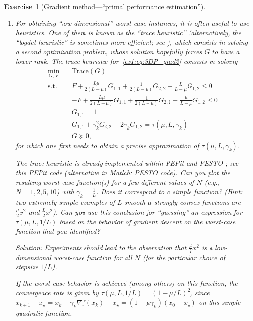 \documentclass[11pt,a4paper]{article}
\newcommand{\pesto}{{PESTO }}
\newcommand{\pepit}{{PEPit }}
\newcommand{\correction}[1]{{{\color{blue}\underline{Solution:} #1}}}
\newcommand{\correction}[1]{}
\newtheorem{exercise}{Exercise}
\begin{document}
\begin{exercise}[Gradient method---``primal performance estimation'']
\begin{enumerate}
	\item For obtaining ``low-dimensional'' worst-case instances, it is often useful to use heuristics. One of them is known as the ``trace heuristic'' (alternatively, the ``logdet heuristic'' is sometimes more efficient; see ), which consists in solving a second optimization problem, whose solution hopefully forces $G$ to have a lower rank. The trace heuristic for~\eqref{ex1:eq:SDP_grad2} consists in solving
	\begin{equation}\label{ex1:eq:trace}
	\begin{aligned}
				\min_{G,\, F} \quad & \mathrm{Trace}(G)\\
			\text{s.t. } \quad & F + \tfrac{L\mu}{2(L-\mu)} G_{1,1}+\tfrac{1}{2(L-\mu)}G_{2,2}-\tfrac{L}{L-\mu}G_{1,2}\leqslant 0\\
			&-F + \tfrac{L\mu}{2(L-\mu)} G_{1,1}+\tfrac{1}{2(L-\mu)}G_{2,2}-\tfrac{\mu}{L-\mu}G_{1,2}\leqslant 0\\
			&G_{1,1}= 1\\
			&G_{1,1}+\gamma_k ^2 G_{2,2}-2\gamma_k G_{1,2}=\tau(\mu,L,\gamma_k)\\
			&G\succcurlyeq 0,
	\end{aligned}
	\end{equation}
	for which one first needs to obtain a precise approximation of $\tau(\mu,L,\gamma_k)$. 
	
	The trace heuristic is already implemented within \pepit and \pesto; see this \href{https://github.com/PerformanceEstimation/Learning-Performance-Estimation/tree/main/Codes/Jupyter/Exercise01.ipynb}{\pepit code} (alternative in Matlab: \href{https://github.com/PerformanceEstimation/Learning-Performance-Estimation/blob/main/Codes/Matlab/Exercise1_dimReduction.m}{\pesto code}). Can you plot the resulting worst-case function(s) for a few different values of $N$ (e.g., $N=1,2,5,10$) with $\gamma_k=\tfrac{1}{L}$. Does it correspond to a simple function? (Hint: two extremely simple examples of $L$-smooth $\mu$-strongly convex functions are $\tfrac{\mu}{2}x^2$ and $\tfrac{L}{2}x^2$). Can you use this conclusion for ``guessing'' an expression for $\tau(\mu,L,1/L)$ based on the behavior of gradient descent on the worst-case function that you identified?
	
	\correction{Experiments should lead to the observation that $\tfrac{\mu}{2}x^2$ is a low-dimensional worst-case function for all $N$ (for the particular choice of stepsize $1/L$).
	
	If the worst-case behavior is achieved (among others) on this function, the convergence rate is given by $\tau(\mu,L,1/L)=(1-\mu/L)^2$, since $x_{k+1}-x_\star=x_k-\gamma_k \nabla f(x_k)-x_\star=(1-\mu\gamma_k)(x_0-x_\star)$ on this simple quadratic function.}


\end{enumerate}
\end{exercise}
\end{document}
